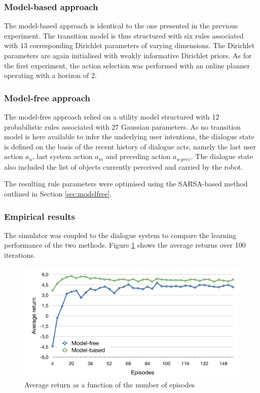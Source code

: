 \subsubsection*{Model-based approach}

The model-based approach is identical to the one presented in the previous experiment. The transition model is thus structured with six rules associated with 13 corresponding Dirichlet parameters of varying dimensions.   The Dirichlet parameters are again initialised with weakly informative Dirichlet priors.  As for the first experiment, the action selection was performed with an online planner operating with a horizon of 2. 

\subsubsection*{Model-free approach}

The model-free approach relied on a utility model structured with 12 probabilistic rules associated with 27 Gaussian parameters. As no transition model is here available to infer the underlying user intentions, the dialogue state is defined on the basis of the recent history of dialogue acts, namely the last user action $a_u$, last system action $a_m$ and preceding action $a_{u\mbox{-}prev}$. The dialogue state also included the list of objects currently perceived and carried by the robot.

The resulting rule parameters were optimised using the SARSA-based method outlined in Section \ref{sec:modelfree}. 

\subsubsection*{Empirical results}

The simulator was coupled to the dialogue system to compare the learning performance of the two methods.  Figure \ref{fig:return_episodes} shows the average returns over 100 iterations.

\begin{figure}[p]
\centering
\includegraphics[scale=0.42]{imgs/episodes.pdf}
\caption{Average return as a function of the number of episodes}
\label{fig:return_episodes}
\end{figure}

